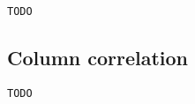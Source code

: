 \begin{verbatim}
TODO
\end{verbatim}

\subsection{Column correlation}
\label{subsec:pd:columncorrelation}

\begin{verbatim}
TODO
\end{verbatim}

